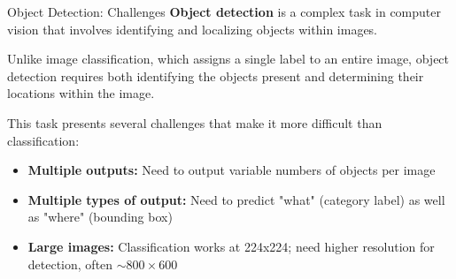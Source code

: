 \begin{frame}[allowframebreaks]{Object Detection: Challenges}
\textbf{Object detection} is a complex task in computer vision that involves identifying and localizing objects within images.

Unlike image classification, which assigns a single label to an entire image, object detection requires both identifying the objects present and determining their locations within the image.

This task presents several challenges that make it more difficult than classification:
\begin{itemize}
    \item \textbf{Multiple outputs:} Need to output variable numbers of objects per image
    \item \textbf{Multiple types of output:} Need to predict "what" (category label) as well as "where" (bounding box)
    \item \textbf{Large images:} Classification works at 224x224; need higher resolution for detection, often $\sim 800 \times 600$
\end{itemize}

\end{frame}
